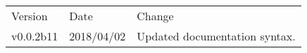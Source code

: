 \begin{tabular}{lll}
  Version&Date&Change\\
  v0.0.2b11&2018/04/02&Updated documentation syntax.
\end{tabular}
